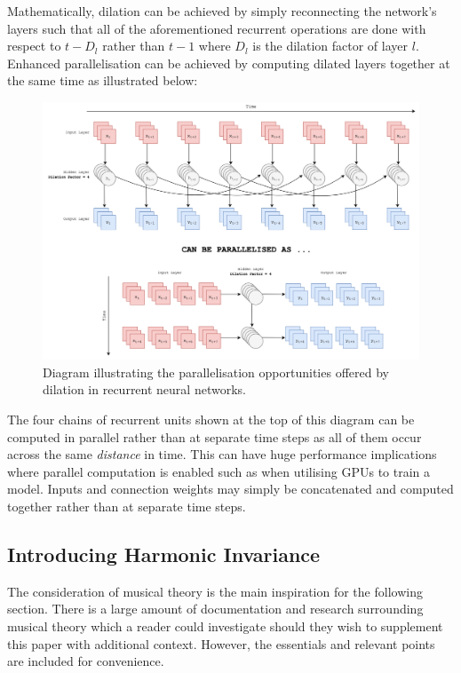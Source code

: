 \documentclass[12pt,]{article}
\begin{document}
Mathematically, dilation can be achieved by simply reconnecting the
network's layers such that all of the aforementioned recurrent
operations are done with respect to \(t-D_l\) rather than \(t-1\) where
\(D_l\) is the dilation factor of layer \(l\). Enhanced parallelisation
can be achieved by computing dilated layers together at the same time as
illustrated below:

\begin{figure}
\centering
\includegraphics{Images/dilatedrnnparallel.png}
\caption{Diagram illustrating the parallelisation opportunities offered
by dilation in recurrent neural networks.}
\end{figure}

The four chains of recurrent units shown at the top of this diagram can
be computed in parallel rather than at separate time steps as all of
them occur across the same \emph{distance} in time. This can have huge
performance implications where parallel computation is enabled such as
when utilising GPUs to train a model. Inputs and connection weights may
simply be concatenated and computed together rather than at separate
time steps.

\hypertarget{introducing-harmonic-invariance}{%
\subsection{Introducing Harmonic
Invariance}\label{introducing-harmonic-invariance}}

The consideration of musical theory is the main inspiration for the
following section. There is a large amount of documentation and research
surrounding musical theory which a reader could investigate should they
wish to supplement this paper with additional context. However, the
essentials and relevant points are included for convenience.
\end{document}
